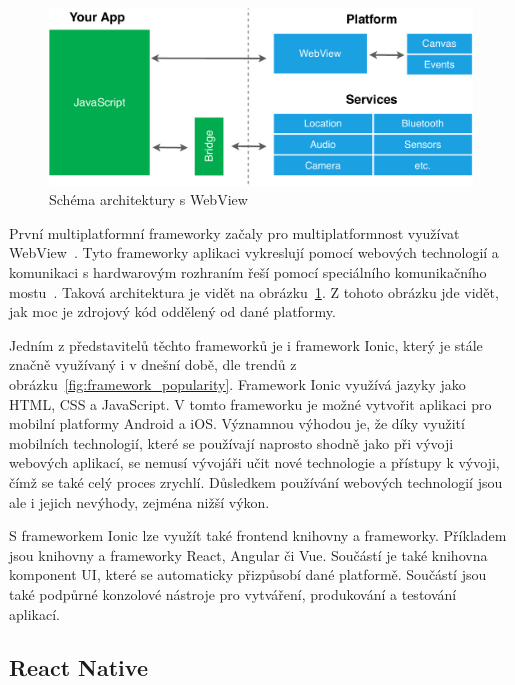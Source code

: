 \begin{figure}[ht!]
    \centering
    \includegraphics[width=\linewidth]{assets/technology-research/framework/webview.pdf}
    \caption{Schéma architektury s WebView~\cite{hackernoon_flutter}}
    \label{fig:framework_webview}
\end{figure}

První multiplatformní frameworky začaly pro multiplatformnost využívat
WebView~\cite{hackernoon_flutter}.
Tyto frameworky aplikaci vykreslují pomocí webových technologií
a komunikaci s hardwarovým rozhraním řeší pomocí speciálního komunikačního
mostu~\cite{hackernoon_flutter}.
Taková architektura je vidět na obrázku~\ref{fig:framework_webview}.
Z tohoto obrázku jde vidět,
jak moc je zdrojový kód oddělený od dané platformy.

Jedním z představitelů těchto frameworků je i framework Ionic,
který je stále značně využívaný i v dnešní době,
dle trendů z obrázku~\ref{fig:framework_popularity}.
Framework Ionic využívá jazyky jako HTML, CSS a JavaScript.
V tomto frameworku je možné vytvořit aplikaci pro mobilní platformy
Android a iOS.
Významnou výhodou je,
že díky využití mobilních technologií,
které se používají naprosto shodně jako při vývoji webových aplikací,
se nemusí vývojáři učit nové technologie a přístupy k vývoji,
čímž se také celý proces zrychlí.
Důsledkem používání webových technologií jsou ale i jejich nevýhody,
zejména nižší výkon.~\cite{dashmagazine_mobile_frameworks}

S frameworkem Ionic lze využít také frontend knihovny a frameworky.
Příkladem jsou knihovny a frameworky React, Angular či Vue.
Součástí je také knihovna komponent UI,
které se automaticky přizpůsobí dané platformě.
Součástí jsou také podpůrné konzolové nástroje pro vytváření, produkování a
testování aplikací.~\cite{ionic}

\subsection{React Native}

